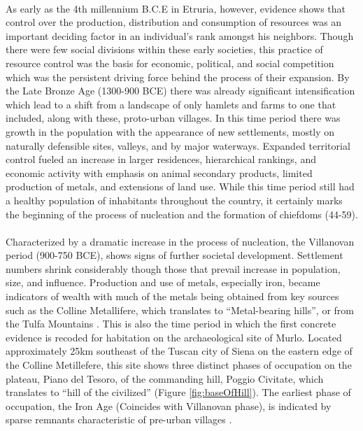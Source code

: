 \documentclass[12pt,a4paper]{thesis}
\begin{document}
\paragraph{}
As early as the 4th millennium B.C.E in Etruria, however, evidence shows that control over the production, distribution and consumption of resources was an important deciding factor in an individual's rank amongst his neighbors. Though there were few social divisions within these early societies, this practice of resource control was the basis for economic, political, and social competition which was the persistent driving force behind the process of their expansion. By the Late Bronze Age (1300-900 BCE) there was already significant intensification which lead to a shift from a landscape of only hamlets and farms to one that included, along with these, proto-urban villages. In this time period there was growth in the population with the appearance of new settlements, mostly on naturally defensible sites, valleys, and by major waterways. Expanded  territorial control fueled an increase in larger residences, hierarchical rankings, and economic activity with emphasis on animal secondary products, limited production of metals, and extensions of land use. While this time period still had a healthy population of inhabitants throughout the country, it certainly marks the beginning of the process of nucleation and the formation of chiefdoms (44-59).

\paragraph{}  
Characterized by a dramatic increase in the process of nucleation, the Villanovan period (900-750 BCE), shows signs of further societal development.  Settlement numbers shrink considerably though those that prevail increase in population, size, and influence. Production and use of metals, especially iron, became indicators of wealth with much of the metals being obtained from key sources such as the Colline Metallifere, which translates to ``Metal-bearing hills'', or from the Tulfa Mountains \cite[75-77]{SpiSto92}. This is also the time period in which the first concrete evidence is recoded for habitation on the archaeological site of Murlo. Located approximately 25km southeast of the Tuscan city of Siena on the eastern edge of the Colline Metillefere, this site shows three distinct phases of occupation on the plateau, Piano del Tesoro, of the commanding hill, Poggio Civitate, which translates to ``hill of the civilized'' (Figure \ref{fig:baseOfHill}). The earliest phase of occupation, the Iron Age (Coincides with Villanovan phase), is indicated by sparse remnants characteristic of pre-urban villages \citep{AnnAnd}.
\end{document}
